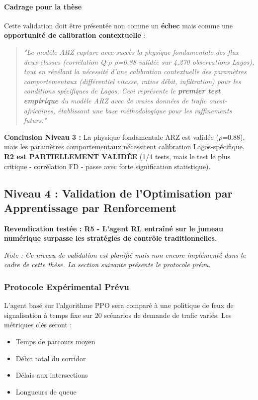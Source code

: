 \paragraph{Cadrage pour la thèse}

Cette validation doit être présentée non comme un \textbf{échec} mais comme une \textbf{opportunité de calibration contextuelle} :

\begin{quote}
    \textit{"Le modèle ARZ capture avec succès la physique fondamentale des flux deux-classes (corrélation Q-$\rho$ $\rho$=0.88 validée sur 4,270 observations Lagos), tout en révélant la nécessité d'une calibration contextuelle des paramètres comportementaux (différentiel vitesse, ratios débit, infiltration) pour les conditions spécifiques de Lagos. Ceci représente le \textbf{premier test empirique} du modèle ARZ avec de vraies données de trafic ouest-africaines, établissant une base méthodologique pour les raffinements futurs."}
\end{quote}

\textbf{Conclusion Niveau 3 :} La physique fondamentale ARZ est validée ($\rho$=0.88), mais les paramètres comportementaux nécessitent calibration Lagos-spécifique. \textbf{R2 est PARTIELLEMENT VALIDÉE} (1/4 tests, mais le test le plus critique - corrélation FD - passe avec forte signification statistique).


\subsection{Niveau 4 : Validation de l'Optimisation par Apprentissage par Renforcement}
\label{sec:validation_rl}

\textbf{Revendication testée : R5 - L'agent RL entraîné sur le jumeau numérique surpasse les stratégies de contrôle traditionnelles.}

\textit{Note : Ce niveau de validation est planifié mais non encore implémenté dans le cadre de cette thèse. La section suivante présente le protocole prévu.}

\subsubsection{Protocole Expérimental Prévu}
\label{subsec:protocole_rl}

L'agent basé sur l'algorithme PPO sera comparé à une politique de feux de signalisation à temps fixe sur 20 scénarios de demande de trafic variés. Les métriques clés seront :
\begin{itemize}
    \item Temps de parcours moyen
    \item Débit total du corridor
    \item Délais aux intersections
    \item Longueurs de queue
\end{itemize}

